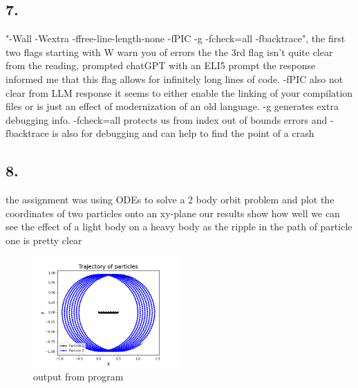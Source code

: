 \documentclass{article}
\begin{document}
        \subsection*{7.}
        "-Wall -Wextra -ffree-line-length-none -fPIC -g -fcheck=all -fbacktrace", the first two flags starting with W warn you of errors
        the the 3rd flag isn't quite clear from the reading, prompted chatGPT with an ELI5 prompt the response informed me that this flag 
        allows for infinitely long lines of code. -fPIC also not clear from LLM response it seems to either enable the linking of your compilation 
        files or is just an effect of modernization of an old language. -g generates extra debugging info. -fcheck=all protects us from index out of bounds errors
        and -fbacktrace is also for debugging and can help to find the point of a crash
        \subsection*{8.}
        the assignment was using ODEs to solve a 2 body orbit problem and plot the coordinates of two particles onto an xy-plane
        our results show how well we can see the effect of a light body on a heavy body as the ripple in the path of particle one is pretty clear
        \begin{figure}[h]  %
            \centering
            \includegraphics[width=0.5\textwidth]{result_graph.png}  %
            \caption{output from program}
            \label{fig:example}
        \end{figure}
\end{document}
